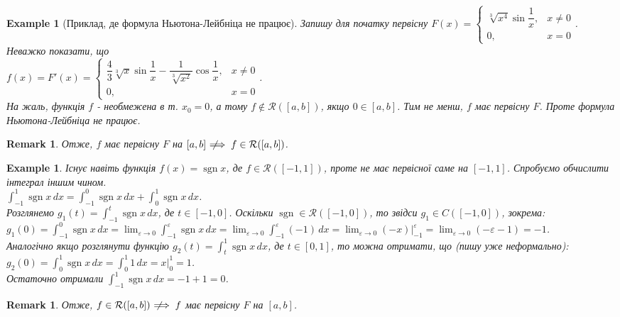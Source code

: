 \documentclass[a4paper, 10pt]{article}
\def\huge{\displaystyle}
\DeclareMathOperator\sign{sgn}
\theoremstyle{theoremdd}
\theoremstyle{theoremdd}
\theoremstyle{theoremdd}
\theoremstyle{theoremdd}
\theoremstyle{theoremdd}
\newtheorem{example}[theorem]{Example}
\theoremstyle{theoremdd}
\theoremstyle{theoremdd}
\newtheorem{remark}[theorem]{Remark}
\theoremstyle{theoremdd}
\theoremstyle{theoremdd}
\newcommand{\notimplies}{\;\not\!\!\!\implies}
\begin{document}
\begin{example}[Приклад, де формула Ньютона-Лейбніца не працює]
Запишу для початку первісну $F(x) = \begin{cases} \sqrt[3]{x^4} \sin \dfrac{1}{x}, & x \neq 0 \\ 0, & x = 0 \end{cases}$. Неважко показати, що\\
$f(x) = F'(x) = \begin{cases} \dfrac{4}{3} \sqrt[3]{x} \sin \dfrac{1}{x} - \dfrac{1}{\sqrt[3]{x^2}} \cos \dfrac{1}{x}, & x \neq 0 \\ 0, & x = 0 \end{cases}$.\\
На жаль, функція $f$ - необмежена в т. $x_0 = 0$, а тому $f \not\in \mathcal{R}([a,b])$, якщо $0 \in [a,b]$. Тим не менш, $f$ має первісну $F$. Проте формула Ньютона-Лейбніца не працює.
\end{example}

\begin{remark}
Отже, $f$ має первісну $F$ на $[a,b] \notimplies f \in \mathcal{R}([a,b])$.
\end{remark}

\begin{example}
Існує навіть функція $f(x) = \sign x$, де $f \in \mathcal{R}([-1,1])$, проте не має первісної саме на $[-1,1]$. Спробуємо обчислити інтеграл іншим чином.\\
$\huge\int_{-1}^1 \sign x \,dx = \int_{-1}^0 \sign x \,dx + \int_0^1 \sign x \,dx$.\\
Розглянемо $g_1(t) = \huge\int_{-1}^t \sign x\,dx$, де $t \in [-1,0]$. Оскільки $\sign \in \mathcal{R}([-1,0])$, то звідси $g_1 \in C([-1,0])$, зокрема:\\
$g_1(0) = \huge\int_{-1}^0 \sign x\,dx = \lim_{\varepsilon \to 0} \int_{-1}^\varepsilon \sign x\,dx = \lim_{\varepsilon \to 0} \int_{-1}^\varepsilon (-1)\,dx = \lim_{\varepsilon \to 0} (-x)\Big|_{-1}^{\varepsilon} = \lim_{\varepsilon \to 0} (-\varepsilon-1) = -1$.\\
Аналогічно якщо розглянути функцію $g_2(t) = \huge\int_t^1 \sign x\,dx$, де $t \in [0,1]$, то можна отримати, що (пишу уже неформально): \\
$g_2(0) = \huge\int_0^1 \sign x\,dx = \int_0^1 1\,dx = x\Big|_0^1 = 1$.\\
Остаточно отримали $\huge\int_{-1}^1 \sign x \,dx = -1 + 1 = 0$.
\end{example}

\begin{remark}
Отже, $f \in \mathcal{R}([a,b]) \notimplies f$ має первісну $F$ на $[a,b]$.
\end{remark}
\end{document}
